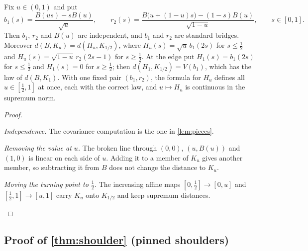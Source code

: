\begin{lemma}\label{lem:seam}
Fix $u\in(0,1)$ and put
\[
b_1(s)=\frac{B(us)-sB(u)}{\sqrt u},\qquad r_2(s)=\frac{B\bigl(u+(1-u)s\bigr)-(1-s)B(u)}{\sqrt{1-u}},\qquad s\in[0,1].
\]
Then $b_1$, $r_2$ and $B(u)$ are independent, and $b_1$ and $r_2$ are standard bridges. Moreover $d(B,K_u)=d(H_u,K_{1/2})$, where $H_u(s)=\sqrt u\,b_1(2s)$ for $s\le\frac12$ and $H_u(s)=\sqrt{1-u}\,r_2(2s-1)$ for $s\ge\frac12$. At the edge put $H_1(s)=b_1(2s)$ for $s\le\frac12$ and $H_1(s)=0$ for $s\ge\frac12$; then $d(H_1,K_{1/2})=V(b_1)$, which has the law of $d(B,K_1)$. With one fixed pair $(b_1,r_2)$, the formula for $H_u$ defines all $u\in[\frac12,1]$ at once, each with the correct law, and $u\mapsto H_u$ is continuous in the supremum norm.
\end{lemma}


\begin{proof}
\begin{steps}
\item \emph{Independence.} The covariance computation is the one in \cref{lem:pieces}.
\item \emph{Removing the value at $u$.} The broken line through $(0,0)$, $(u,B(u))$ and $(1,0)$ is linear on each side of $u$. Adding it to a member of $K_u$ gives another member, so subtracting it from $B$ does not change the distance to $K_u$.
\item \emph{Moving the turning point to $\frac12$.} The increasing affine maps $[0,\frac12]\to[0,u]$ and $[\frac12,1]\to[u,1]$ carry $K_u$ onto $K_{1/2}$ and keep supremum distances.\qedhere
\end{steps}
\end{proof}

\subsection{Proof of \cref{thm:shoulder} (pinned shoulders)}


